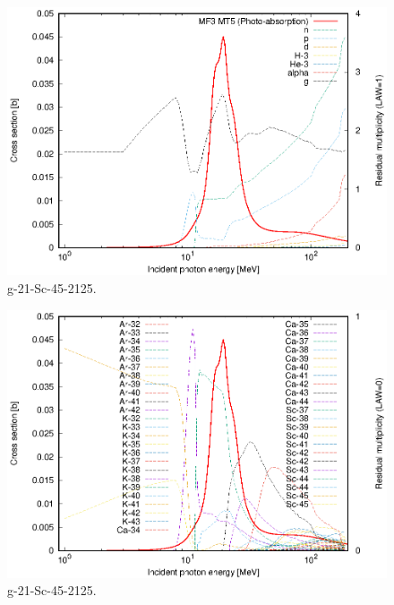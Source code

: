 \begin{figure}
 \includegraphics[width=\linewidth]{eps/g_21-Sc-45_2125.eps}
  \caption{g-21-Sc-45-2125.}
\end{figure}
\begin{figure}
 \includegraphics[width=\linewidth]{eps-law0/g_21-Sc-45_2125.eps}
 \caption{g-21-Sc-45-2125.}
\end{figure}
\newpage \clearpage

